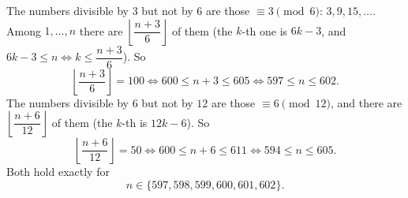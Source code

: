 The numbers divisible by $3$ but not by $6$ are those $\equiv3\pmod6$: $3,9,15,\dots$. Among $1,\dots,n$ there are $\left\lfloor\dfrac{n+3}{6}\right\rfloor$ of them (the $k$-th one is $6k-3$, and $6k-3\le n\iff k\le\dfrac{n+3}{6}$). So
\[\left\lfloor\dfrac{n+3}{6}\right\rfloor=100\iff600\le n+3\le605\iff597\le n\le602.\]
The numbers divisible by $6$ but not by $12$ are those $\equiv6\pmod{12}$, and there are $\left\lfloor\dfrac{n+6}{12}\right\rfloor$ of them (the $k$-th is $12k-6$). So
\[\left\lfloor\dfrac{n+6}{12}\right\rfloor=50\iff600\le n+6\le611\iff594\le n\le605.\]
Both hold exactly for
\[\boxed{n\in\{597,598,599,600,601,602\}}.\]

